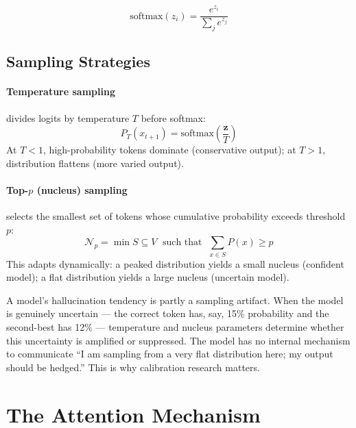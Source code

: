 \begin{equation}
\text{softmax}(z_i) = \frac{e^{z_i}}{\displaystyle\sum_j e^{z_j}}
\label{eq:softmax}
\end{equation}

\subsection{Sampling Strategies}

\paragraph{Temperature sampling} divides logits by temperature $T$ before softmax:
\begin{equation}
P_T(x_{t+1}) = \text{softmax}\!\left(\frac{\mathbf{z}}{T}\right)
\label{eq:temperature}
\end{equation}
At $T < 1$, high-probability tokens dominate (conservative output); at $T > 1$, distribution flattens (more varied output).

\paragraph{Top-$p$ (nucleus) sampling} \autocite{holtzman2020curious} selects the smallest set of tokens whose cumulative probability exceeds threshold $p$:
\begin{equation}
\mathcal{N}_p = \min S \subseteq V \;\text{ such that }\; \sum_{x \in S} P(x) \geq p
\label{eq:nucleus}
\end{equation}
This adapts dynamically: a peaked distribution yields a small nucleus (confident model); a flat distribution yields a large nucleus (uncertain model).

\begin{technote}
A model's hallucination tendency is partly a sampling artifact. When the model is genuinely uncertain --- the correct token has, say, 15\% probability and the second-best has 12\% --- temperature and nucleus parameters determine whether this uncertainty is amplified or suppressed. The model has no internal mechanism to communicate ``I am sampling from a very flat distribution here; my output should be hedged.'' This is why calibration research matters.
\end{technote}

\section{The Attention Mechanism}
\label{sec:app10-attention}

